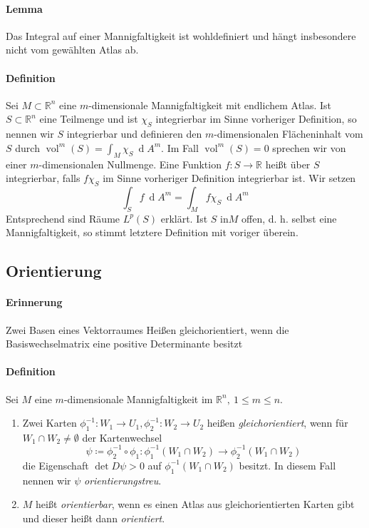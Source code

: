 \documentclass[12pt,a4paper,fleqn]{article}
\def\R{{\mathbb{R}}}
\def\d{{\operatorname{d}}}
\begin{document}
\paragraph{Lemma} Das Integral auf einer Mannigfaltigkeit ist wohldefiniert und hängt insbesondere nicht vom gewählten Atlas ab.

\paragraph{Definition} Sei $M \subset \R^n$ eine $m$-dimensionale Mannigfaltigkeit mit endlichem Atlas. Ist $S \subset \R^n$ eine Teilmenge und ist $\chi_S$ integrierbar im Sinne vorheriger Definition, so nennen wir $S$ integrierbar und definieren den $m$-dimensionalen Flächeninhalt vom $S$ durch $\operatorname{vol}^m(S) = \int_M \chi_S\ \d A^m$. Im Fall $\operatorname{vol}^m(S) = 0$ sprechen wir von einer $m$-dimensionalen Nullmenge. Eine Funktion $f\colon S \rightarrow \R$ heißt über $S$ integrierbar, falls $f\chi_S$ im Sinne vorheriger Definition integrierbar ist. Wir setzen 
\begin{displaymath}
\int_S f\ \d A^m = \int_M f\chi_S\ \d A^m
\end{displaymath}
Entsprechend sind Räume $L^p(S)$ erklärt. Ist $S$ in$M$ offen, d. h. selbst eine Mannigfaltigkeit, so stimmt letztere Definition mit voriger überein.

\subsection{Orientierung}

\paragraph{Erinnerung} Zwei Basen eines Vektorraumes Heißen gleichorientiert, wenn die Basiswechselmatrix eine positive Determinante besitzt

\paragraph{Definition} Sei $M$ eine $m$-dimensionale Mannigfaltigkeit im $\R^n,\ 1\leq m\leq n$.
\begin{enumerate}
\item Zwei Karten $\phi^{-1}_1\colon W_1 \rightarrow U_1, \phi^{-1}_2\colon W_2 \rightarrow U_2$ heißen \textit{gleichorientiert}, wenn für $W_1 \cap W_2 \neq \emptyset$ der Kartenwechsel 
\begin{displaymath}
\psi \coloneqq \phi_2^{-1} \circ \phi_1 \colon \phi_1^{-1}(W_1\cap W_2) \rightarrow \phi_2^{-1}(W_1\cap W_2)
\end{displaymath}
die Eigenschaft $\det D\psi > 0$ auf $\phi_1^{-1}(W_1 \cap W_2)$ besitzt. In diesem Fall nennen wir $\psi$ \textit{orientierungstreu}.
\item $M$ heißt \textit{orientierbar}, wenn es einen Atlas aus gleichorientierten Karten gibt und dieser heißt dann \textit{orientiert}.
\end{enumerate}
\end{document}
